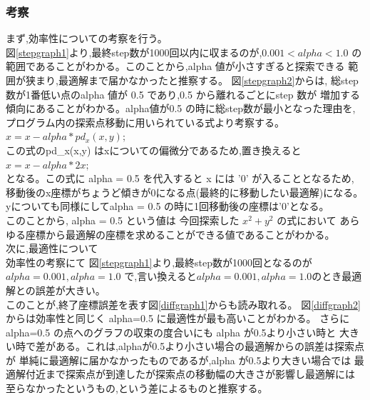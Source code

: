 \subsubsection{考察}
まず,効率性についての考察を行う。\\
図\ref{stepgraph1}より,最終step数が1000回以内に収まるのが,$0.001 < alpha < 1.0$
の範囲であることがわかる。このことから,alpha 値が小さすぎると探索できる
範囲が狭まり,最適解まで届かなかったと推察する。 図\ref{stepgraph2}からは,
総step数が1番低い点のalpha 値が 0.5 であり,0.5 から離れるごとにstep 数が
増加する傾向にあることがわかる。alpha値が0.5 の時に総step数が最小となった理由を,
プログラム内の探索点移動に用いられている式より考察する。\\
$x = x - alpha*pd_x(x,y);$\\
この式のpd\_x(x,y) はxについての偏微分であるため,置き換えると\\
$x = x - alpha*2x;$\\
となる。この式に alpha = 0.5 を代入すると x には '0' が入ることとなるため,
移動後のx座標がちょうど傾きが0になる点(最終的に移動したい最適解)になる。
yについても同様にしてalpha = 0.5 の時に1回移動後の座標は'0'となる。\\
このことから, alpha = 0.5 という値は 今回探索した $x^2 + y^2$ の式において
あらゆる座標から最適解の座標を求めることができる値であることがわかる。\\

次に,最適性について\\
効率性の考察にて
図\ref{stepgraph1}より,最終step数が1000回となるのが$alpha=0.001 , alpha=1.0$
で,言い換えると$alpha=0.001 , alpha=1.0$のとき最適解との誤差が大きい。\\
このことが,終了座標誤差を表す図\ref{diffgraph1}からも読み取れる。
図\ref{diffgraph2}からは効率性と同じく alpha=0.5 に最適性が最も高いことがわかる。
さらにalpha=0.5 の点へのグラフの収束の度合いにも alpha が0.5より小さい時と
大きい時で差がある。これは,alphaが0.5より小さい場合の最適解からの誤差は探索点が
単純に最適解に届かなかったものであるが,alpha が0.5より大きい場合では
最適解付近まで探索点が到達したが探索点の移動幅の大きさが影響し最適解には
至らなかったというもの,という差によるものと推察する。

